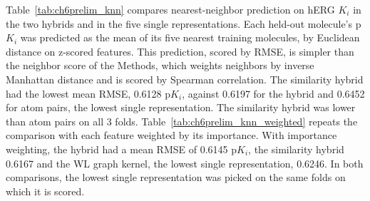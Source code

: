 Table~\ref{tab:ch6prelim_knn} compares nearest-neighbor prediction on hERG $K_i$ in the two hybrids and in the five single representations. Each held-out molecule's p$K_i$ was predicted as the mean of its five nearest training molecules, by Euclidean distance on z-scored features. This prediction, scored by RMSE, is simpler than the neighbor score of the Methods, which weights neighbors by inverse Manhattan distance and is scored by Spearman correlation. The similarity hybrid had the lowest mean RMSE, 0.6128 p$K_i$, against 0.6197 for the hybrid and 0.6452 for atom pairs, the lowest single representation. The similarity hybrid was lower than atom pairs on all 3 folds. Table~\ref{tab:ch6prelim_knn_weighted} repeats the comparison with each feature weighted by its importance. With importance weighting, the hybrid had a mean RMSE of 0.6145 p$K_i$, the similarity hybrid 0.6167 and the WL graph kernel, the lowest single representation, 0.6246. In both comparisons, the lowest single representation was picked on the same folds on which it is scored.

